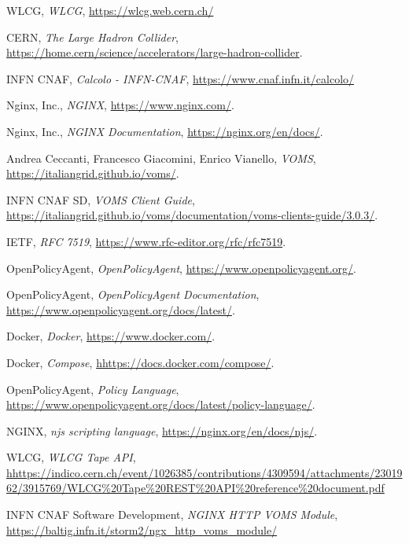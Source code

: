 \begin{thebibliography}{99}
	
	WLCG, 
	\textit{WLCG},
	\url{https://wlcg.web.cern.ch/}

	CERN, 
	\textit{The Large Hadron Collider},
	\url{https://home.cern/science/accelerators/large-hadron-collider}.

	INFN CNAF,
	\textit{Calcolo - INFN-CNAF},
	\url{https://www.cnaf.infn.it/calcolo/}

	Nginx, Inc.,
	\textit{NGINX},
	\url{https://www.nginx.com/}.

	Nginx, Inc.,
	\textit{NGINX Documentation},
	\url{https://nginx.org/en/docs/}.

	Andrea Ceccanti, Francesco Giacomini, Enrico Vianello,
	\textit{VOMS},
	\url{https://italiangrid.github.io/voms/}.

	INFN CNAF SD,
	\textit{VOMS Client Guide},
	\url{https://italiangrid.github.io/voms/documentation/voms-clients-guide/3.0.3/}.

	IETF,
	\textit{RFC 7519},
	\url{https://www.rfc-editor.org/rfc/rfc7519}.

	OpenPolicyAgent,
	\textit{OpenPolicyAgent},
	\url{https://www.openpolicyagent.org/}.

	OpenPolicyAgent,
	\textit{OpenPolicyAgent Documentation},
	\url{https://www.openpolicyagent.org/docs/latest/}.

	Docker,
	\textit{Docker},
	\url{https://www.docker.com/}.

	Docker,
	\textit{Compose},
	\url{hhttps://docs.docker.com/compose/}.

	OpenPolicyAgent,
	\textit{Policy Language},
	\url{https://www.openpolicyagent.org/docs/latest/policy-language/}.

	NGINX,
	\textit{njs scripting language},
	\url{https://nginx.org/en/docs/njs/}.
    
	WLCG,
	\textit{WLCG Tape API},
	\url{hhttps://indico.cern.ch/event/1026385/contributions/4309594/attachments/2301962/3915769/WLCG%20Tape%20REST%20API%20reference%20document.pdf}

	INFN CNAF Software Development,
	\textit{NGINX HTTP VOMS Module},
	\url{https://baltig.infn.it/storm2/ngx_http_voms_module/}


\end{thebibliography}
